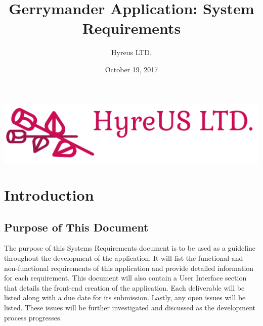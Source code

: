 \documentclass{article}
\begin{document}
\begin{titlepage}
	\title{Gerrymander Application: System Requirements}
	\author{Hyreus LTD.}
	\date{October 19, 2017}
	\maketitle
	\thispagestyle{empty}
	
	\begin{center}
	\hspace*{-2cm}      
	\includegraphics[scale=.25]{Logo.png}
	\end{center}
\end{titlepage}



\tableofcontents
\thispagestyle{empty}
\cleardoublepage

\setcounter{page}{1}



\section{Introduction}\label{sec:intro}


\subsection{Purpose of This Document}

\vspace{2.5mm}

\begin{addmargin}[4em]{0em}

The purpose of this Systems Requirements document is to be used as a guideline throughout the development of the application. It will list the functional and non-functional requirements of this application and provide detailed information for each requirement. This document will also contain a User Interface section that details the front-end creation of the application. Each deliverable will be listed along with a due date for its submission. Lastly, any open issues will be listed. These issues will be further investigated and discussed as the development process progresses.

\end{addmargin}
\end{document}
